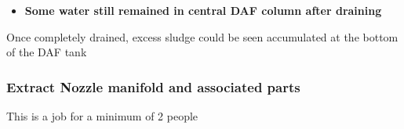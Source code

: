 \documentclass[
  letterpaper,
  DIV=11,
  numbers=noendperiod]{scrreprt}
\providecommand{\tightlist}{%
  \setlength{\itemsep}{0pt}\setlength{\parskip}{0pt}}\usepackage{longtable,booktabs,array}
\begin{document}
\begin{itemize}
\tightlist
\item
  \textbf{Some water still remained in central DAF column after
  draining}
\end{itemize}

{Once completely drained, excess sludge could be seen accumulated at the
bottom of the DAF tank}

\hypertarget{extract-nozzle-manifold-and-associated-parts}{%
\subsubsection{Extract Nozzle manifold and associated
parts}\label{extract-nozzle-manifold-and-associated-parts}}

{This is a job for a minimum of 2 people}
\end{document}
